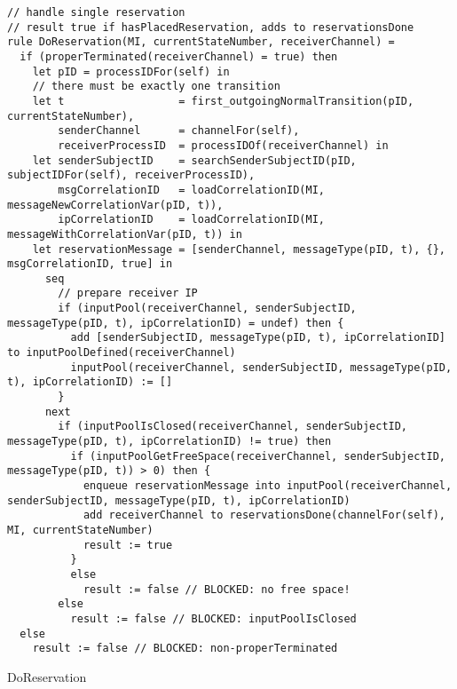 \begin{listing}[H]
\begin{verbatim}
// handle single reservation
// result true if hasPlacedReservation, adds to reservationsDone
rule DoReservation(MI, currentStateNumber, receiverChannel) =
  if (properTerminated(receiverChannel) = true) then
    let pID = processIDFor(self) in
    // there must be exactly one transition
    let t                  = first_outgoingNormalTransition(pID, currentStateNumber),
        senderChannel      = channelFor(self),
        receiverProcessID  = processIDOf(receiverChannel) in
    let senderSubjectID    = searchSenderSubjectID(pID, subjectIDFor(self), receiverProcessID),
        msgCorrelationID   = loadCorrelationID(MI, messageNewCorrelationVar(pID, t)),
        ipCorrelationID    = loadCorrelationID(MI, messageWithCorrelationVar(pID, t)) in
    let reservationMessage = [senderChannel, messageType(pID, t), {}, msgCorrelationID, true] in
      seq
        // prepare receiver IP
        if (inputPool(receiverChannel, senderSubjectID, messageType(pID, t), ipCorrelationID) = undef) then {
          add [senderSubjectID, messageType(pID, t), ipCorrelationID] to inputPoolDefined(receiverChannel)
          inputPool(receiverChannel, senderSubjectID, messageType(pID, t), ipCorrelationID) := []
        }
      next
        if (inputPoolIsClosed(receiverChannel, senderSubjectID, messageType(pID, t), ipCorrelationID) != true) then
          if (inputPoolGetFreeSpace(receiverChannel, senderSubjectID, messageType(pID, t)) > 0) then {
            enqueue reservationMessage into inputPool(receiverChannel, senderSubjectID, messageType(pID, t), ipCorrelationID)
            add receiverChannel to reservationsDone(channelFor(self), MI, currentStateNumber)
            result := true
          }
          else
            result := false // BLOCKED: no free space!
        else
          result := false // BLOCKED: inputPoolIsClosed
  else
    result := false // BLOCKED: non-properTerminated
\end{verbatim}
\caption{DoReservation}
\label{lst:asm:DoReservation}
\end{listing}




